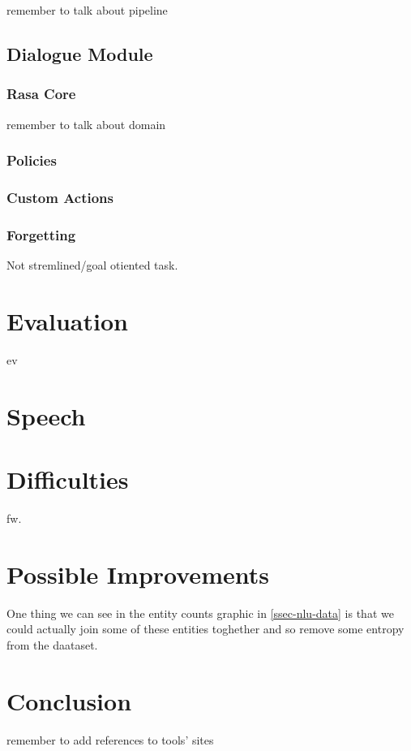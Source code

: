 \documentclass[11pt,a4paper]{article}
\begin{document}
	remember to talk about pipeline

\subsection{Dialogue Module}
\label{ssec-dialogue-module}

\subsubsection{Rasa Core}
\label{ssec-rasa-core}	

	remember to talk about domain

\subsubsection{Policies}
\label{ssec-policies}	

\subsubsection{Custom Actions}
\label{ssec-custom-actions}	

\subsubsection{Forgetting}
\label{ssec-forgetting}	

Not stremlined/goal otiented task.

\section{Evaluation}
\label{sec-evaluation}

	ev

\section{Speech}
\label{sec-speech}

	

\section{Difficulties}
\label{sec-difficulties}

	fw.

\section{Possible Improvements}

	One thing we can see in the entity counts graphic in \ref{ssec-nlu-data} is that we could actually join some of these entities toghether and so remove some entropy from the daataset.

\section{Conclusion}
\label{sec-conclusion}
	
	remember to add references to tools' sites
	



%

%


%
\end{document}
